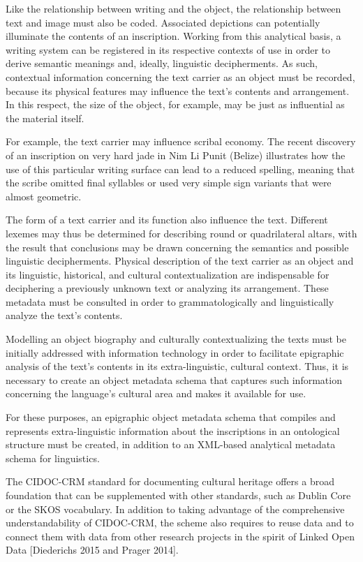 \documentclass[amsthm,ebook]{saparticle}
\begin{document}
Like the relationship between writing and the object, the relationship between text and image must also be coded.
Associated depictions can potentially illuminate the contents of an inscription. Working from this analytical basis, a
writing system can be registered in its respective contexts of use in order to derive semantic meanings and, ideally,
linguistic decipherments. As such, contextual information concerning the text carrier as an object must be recorded,
because its physical features may influence the text’s contents and arrangement. In this respect, the size of the
object, for example, may be just as influential as the material itself.

For example, the text carrier may influence scribal economy. The recent discovery of an inscription on very hard jade in
Nim Li Punit (Belize) illustrates how the use of this particular writing surface can lead to a reduced spelling,
meaning that the scribe omitted final syllables or used very simple sign variants that were almost geometric. 

The form of a text carrier and its function also influence the text. Different lexemes may thus be determined for
describing round or quadrilateral altars, with the result that conclusions may be drawn concerning the semantics and
possible linguistic decipherments. Physical description of the text carrier as an object and its linguistic,
historical, and cultural contextualization are indispensable for deciphering a previously unknown text or analyzing its
arrangement. These metadata must be consulted in order to grammatologically and linguistically analyze the text’s
contents. 

Modelling an object biography and culturally contextualizing the texts must be initially addressed with information
technology in order to facilitate epigraphic analysis of the text’s contents in its extra-linguistic, cultural context.
Thus, it is necessary to create an object metadata schema that captures such information concerning the language’s
cultural area and makes it available for use. 

For these purposes, an epigraphic object metadata schema that compiles and represents extra-linguistic information about
the inscriptions in an ontological structure must be created, in addition to an XML-based analytical metadata schema
for linguistics. 

The CIDOC-CRM standard for documenting cultural heritage offers a broad foundation that can be supplemented with other
standards, such as Dublin Core or the SKOS vocabulary. In addition to taking advantage of the comprehensive
understandability of CIDOC-CRM, the scheme also requires to reuse data and to connect them with data from other
research projects in the spirit of Linked Open Data [Diederichs 2015 and Prager 2014].
\end{document}
